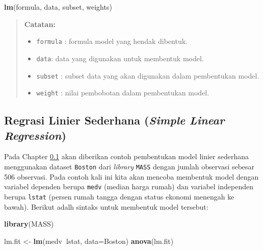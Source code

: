 \documentclass[]{book}
\newenvironment{Shaded}{\begin{snugshade}}{\end{snugshade}}
\newcommand{\DataTypeTok}[1]{\textcolor[rgb]{0.13,0.29,0.53}{#1}}
\newcommand{\KeywordTok}[1]{\textcolor[rgb]{0.13,0.29,0.53}{\textbf{#1}}}
\newcommand{\NormalTok}[1]{#1}
\newcommand{\OperatorTok}[1]{\textcolor[rgb]{0.81,0.36,0.00}{\textbf{#1}}}
\newcommand{\StringTok}[1]{\textcolor[rgb]{0.31,0.60,0.02}{#1}}
\providecommand{\tightlist}{%
  \setlength{\itemsep}{0pt}\setlength{\parskip}{0pt}}
\theoremstyle{definition}
\theoremstyle{definition}
\theoremstyle{definition}
\theoremstyle{remark}
\begin{document}
\begin{Shaded}
\begin{Highlighting}[]
\KeywordTok{lm}\NormalTok{(formula, data, subset, weights)}
\end{Highlighting}
\end{Shaded}

\begin{quote}
\textbf{Catatan:}

\begin{itemize}
\tightlist
\item
  \texttt{formula} : formula model yang hendak dibentuk.
\item
  \texttt{data}: data yang digunakan untuk membentuk model.
\item
  \texttt{subset} : subset data yang akan digunakan dalam pembentukan model.
\item
  \texttt{weight} : nilai pembobotan dalam pembentukan model.
\end{itemize}
\end{quote}

\hypertarget{SLR}{%
\subsection{\texorpdfstring{Regrasi Linier Sederhana (\emph{Simple Linear Regression})}{Regrasi Linier Sederhana (Simple Linear Regression)}}\label{SLR}}

Pada Chapter \ref{SLR} akan diberikan contoh pembentukan model linier sederhana menggunakan dataset \texttt{Boston} dari \emph{library} \texttt{MASS} dengan jumlah observasi sebesar 506 observasi. Pada contoh kali ini kita akan mencoba membentuk model dengan variabel dependen berupa \texttt{medv} (median harga rumah) dan variabel independen berupa \texttt{lstat} (persen rumah tangga dengan status ekonomi menengah ke bawah). Berikut adalh sintaks untuk membentuk model tersebut:

\begin{Shaded}
\begin{Highlighting}[]
\KeywordTok{library}\NormalTok{(MASS)}
\end{Highlighting}
\end{Shaded}

\begin{Shaded}
\begin{Highlighting}[]
\NormalTok{lm.fit <-}\StringTok{ }\KeywordTok{lm}\NormalTok{(medv}\OperatorTok{~}\NormalTok{lstat, }\DataTypeTok{data=}\NormalTok{Boston)}
\KeywordTok{anova}\NormalTok{(lm.fit)}
\end{Highlighting}
\end{Shaded}
\end{document}
